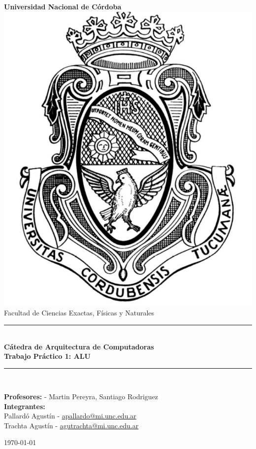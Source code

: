 \begin{titlepage}
    \begin{center}
        {\LARGE \textbf{Universidad Nacional de Córdoba}}\\[1.5cm]

        \includegraphics[scale=0.4]{img/logo2.png}\\[1.5cm]

        {\large Facultad de Ciencias Exactas, Físicas y Naturales}\\

        \rule{\linewidth}{0.5mm}\\[0.4cm]
        {\Large \textbf{Cátedra de Arquitectura de Computadoras}}\\[0.3cm]
        {\LARGE \textbf{Trabajo Práctico 1: ALU}}\\[0.3cm]
        \rule{\linewidth}{0.5mm}\\[1cm]

        \begin{flushleft}
        {\large 
            \textbf{Profesores:} - Martin Pereyra, Santiago Rodriguez\\
            \textbf{Integrantes:}\\
            Pallardó Agustín - 
            \href{mailto:apallardo@mi.unc.edu.ar}{apallardo@mi.unc.edu.ar}\\
            Trachta Agustín - 
            \href{mailto:agutrachta@mi.unc.edu.ar}{agutrachta@mi.unc.edu.ar}\\
        }
        \end{flushleft}

        \vfill

        {\large \today}
    \end{center}
\end{titlepage}